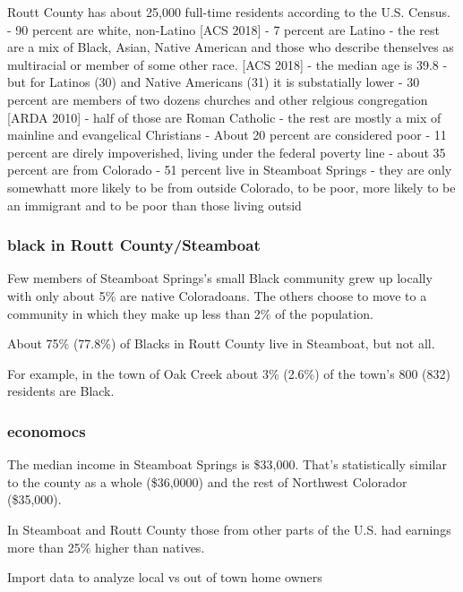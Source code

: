 \documentclass[]{article}
\begin{document}
Routt County has about 25,000 full-time residents according to the U.S.
Census. - 90 percent are white, non-Latino {[}ACS 2018{]} - 7 percent
are Latino - the rest are a mix of Black, Asian, Native American and
those who describe thenselves as multiracial or member of some other
race. {[}ACS 2018{]} - the median age is 39.8 - but for Latinos (30) and
Native Americans (31) it is substatially lower - 30 percent are members
of two dozens churches and other relgious congregation {[}ARDA 2010{]} -
half of those are Roman Catholic - the rest are mostly a mix of mainline
and evangelical Christians - About 20 percent are considered poor - 11
percent are direly impoverished, living under the federal poverty line -
about 35 percent are from Colorado - 51 percent live in Steamboat
Springs - they are only somewhatt more likely to be from outside
Colorado, to be poor, more likely to be an immigrant and to be poor than
those living outsid

\hypertarget{black-in-routt-countysteamboat}{%
\subsubsection{black in Routt
County/Steamboat}\label{black-in-routt-countysteamboat}}

Few members of Steamboat Springs's small Black community grew up locally
with only about 5\% are native Coloradoans. The others choose to move to
a community in which they make up less than 2\% of the population.

About 75\% (77.8\%) of Blacks in Routt County live in Steamboat, but not
all.

For example, in the town of Oak Creek about 3\% (2.6\%) of the town's
800 (832) residents are Black.

\hypertarget{economocs}{%
\subsubsection{economocs}\label{economocs}}

The median income in Steamboat Springs is \$33,000. That's statistically
similar to the county as a whole (\$36,0000) and the rest of Northwest
Colorador (\$35,000).

In Steamboat and Routt County those from other parts of the U.S. had
earnings more than 25\% higher than natives.

Import data to analyze local vs out of town home owners
\end{document}
